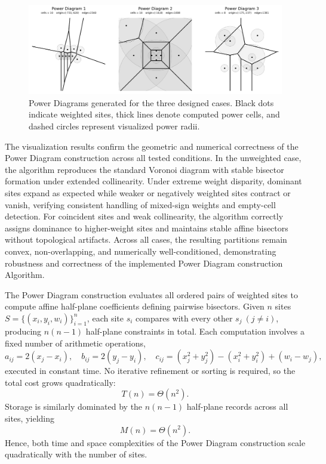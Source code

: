 \documentclass{article}
\begin{document}

\begin{figure}[H]
    \centering
    \includegraphics[width=0.95\linewidth]{Pictures/power_diagram.png}
    \caption{Power Diagrams generated for the three designed cases. 
    Black dots indicate weighted sites, thick lines denote computed power cells, and dashed circles represent visualized power radii.}
    \label{fig:power_diagrams}
\end{figure}

The visualization results confirm the geometric and numerical correctness of the Power Diagram construction across all tested conditions.  
In the unweighted case, the algorithm reproduces the standard Voronoi diagram with stable bisector formation under extended collinearity.  
Under extreme weight disparity, dominant sites expand as expected while weaker or negatively weighted sites contract or vanish, verifying consistent handling of mixed-sign weights and empty-cell detection.  
For coincident sites and weak collinearity, the algorithm correctly assigns dominance to higher-weight sites and maintains stable affine bisectors without topological artifacts.  
Across all cases, the resulting partitions remain convex, non-overlapping, and numerically well-conditioned, demonstrating robustness and correctness of the implemented Power Diagram construction Algorithm.



The Power Diagram construction evaluates all ordered pairs of weighted sites to compute affine half-plane coefficients defining pairwise bisectors.  
Given \(n\) sites \(S=\{(x_i,y_i,w_i)\}_{i=1}^n\), each site \(s_i\) compares with every other \(s_j\ (j\ne i)\), producing \(n(n-1)\) half-plane constraints in total.  
Each computation involves a fixed number of arithmetic operations,
\[
a_{ij}=2(x_j-x_i),\quad b_{ij}=2(y_j-y_i),\quad c_{ij}=(x_j^2+y_j^2)-(x_i^2+y_i^2)+(w_i-w_j),
\]
executed in constant time.  
No iterative refinement or sorting is required, so the total cost grows quadratically:
\[
T(n)=\Theta(n^2).
\]
Storage is similarly dominated by the \(n(n-1)\) half-plane records across all sites, yielding
\[
M(n)=\Theta(n^2).
\]
Hence, both time and space complexities of the Power Diagram construction scale quadratically with the number of sites.
\end{document}
